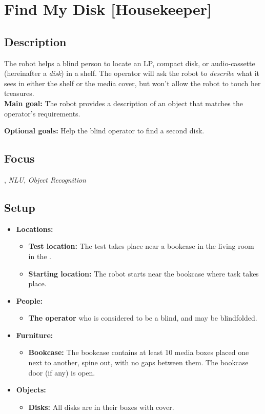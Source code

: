 \section{Find My Disk [Housekeeper]}
\label{test:find-my-disk}

\subsection*{Description}
   The robot helps a blind person to locate an LP, compact disk, or audio-cassette (hereinafter a \textit{disk}) in a shelf. The operator will ask the robot to \emph{describe} what it sees in either the shelf or the media cover, but won't allow the robot to touch her treasures.\\

\textbf{Main goal:}
   The robot provides a description of an object that matches the operator's requirements.

\textbf{Optional goals:} Help the blind operator to find a second disk.

\subsection*{Focus}
\HRI{}, \textit{NLU}, \textit{Object Recognition}


\subsection*{Setup}
\begin{itemize}[nosep]
	\item \textbf{Locations:}
		\begin{itemize}
			\item \textbf{Test location:} The test takes place near a bookcase in the living room in the \Arena{}.
			\item \textbf{Starting location:} The robot starts near the bookcase where task takes place.
		\end{itemize}
	\item \textbf{People:}
		\begin{itemize}
			\item \textbf{The operator} who is considered to be a blind, and may be blindfolded.
		\end{itemize}
	\item \textbf{Furniture:}
		\begin{itemize}
			\item \textbf{Bookcase:} The bookcase contains at least 10 media boxes placed one next to another, spine out, with no gaps between them. The bookcase door (if any) is open.
		\end{itemize}
	\item \textbf{Objects:}
		\begin{itemize}
			\item \textbf{Disks:} All disks are in their boxes with cover.
		\end{itemize}
\end{itemize}

